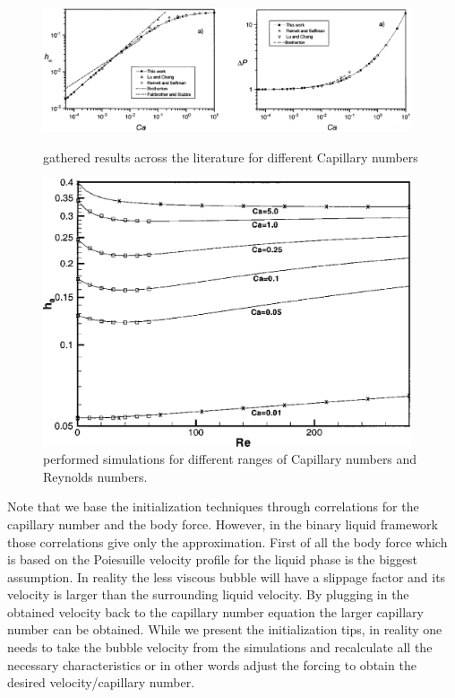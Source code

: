 \documentclass{article}
\begin{document}
\begin{figure}
\includegraphics[width=0.97\textwidth]{Figures/giavedoni_planar.eps}
\caption{\citet{giavedoni-numerical} gathered results across the
literature for different Capillary numbers \label{fig:giavedoni:planar}}
\includegraphics[width=0.97\textwidth]{Figures/heil-planar.eps}
\caption{\citet{heil-bretherton} performed simulations for different ranges of
Capillary numbers and Reynolds numbers. \label{fig:heil:planar}}
\end{figure}
Note that we base the initialization techniques through correlations for the
capillary number and the body force. However, in the binary liquid framework
those correlations give only the approximation. First of all the body force
which is based on the Poiesuille velocity profile for the liquid phase is the
biggest assumption. In reality the less viscous bubble will have a slippage
factor and its velocity is larger than the surrounding liquid velocity. By
plugging in the obtained velocity back to the capillary number equation the
larger capillary number can be obtained. While we present the initialization
tips, in reality one needs to take the bubble velocity from the simulations and
recalculate all the necessary characteristics or in other words adjust the
forcing to obtain the desired velocity/capillary number. 
\end{document}
